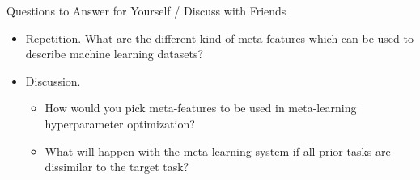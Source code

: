 \begin{frame}[c]{Questions to Answer for Yourself / Discuss with Friends}

\begin{itemize}
    \item \alert{Repetition.} What are the different kind of meta-features which can be used to describe machine learning datasets?
    
    \medskip

    \item \alert{Discussion.}
    \begin{itemize}
        \item How would you pick meta-features to be used in meta-learning hyperparameter optimization?
        \item What will happen with the meta-learning system if all prior tasks are dissimilar to the target task?
    \end{itemize}
\end{itemize}

\end{frame}